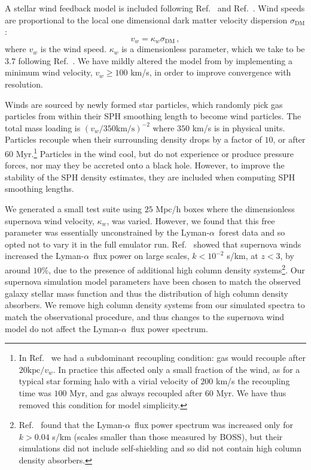 \documentclass[a4paper,11pt]{article}
\newcommand{\Lya}{Lyman-$\alpha$}
\begin{document}
A stellar wind feedback model is included following Ref.~\citep{Okamoto:2010} and Ref.~\cite{Bird:2022}. Wind speeds are proportional to the local one dimensional dark matter velocity dispersion $\sigma_\mathrm{DM}$:
\begin{equation}
v_w = \kappa_w \sigma_\mathrm{DM} \,,
\end{equation}
where $v_w$ is the wind speed. $\kappa_w$ is a dimensionless parameter, which we take to be $3.7$ following Ref.~\cite{Vogelsberger:2013}. We have mildly altered the model from \cite{Bird:2022} by implementing a minimum wind velocity, $v_w \geq 100$ km/s, in order to improve convergence with resolution.

Winds are sourced by newly formed star particles, which randomly pick gas particles from within their SPH smoothing length to become wind particles. The total mass loading is $(v_w/ 350 \mathrm{km/s})^{-2}$ where $350$ km/s is in physical units. Particles recouple when their surrounding density drops by a factor of $10$, or after $60$ Myr.\footnote{In Ref.~\cite{Bird:2022} we had a subdominant recoupling condition: gas would recouple after $20 \mathrm{kpc} / v_w$. In practice this affected only a small fraction of the wind, as for a typical star forming halo with a virial velocity of $200$ km/s the recoupling time was $100$ Myr, and gas always recoupled after $60$ Myr. We have thus removed this condition for model simplicity.} Particles in the wind cool, but do not experience or produce pressure forces, nor may they be accreted onto a black hole. However, to improve the stability of the SPH density estimates, they are included when computing SPH smoothing lengths.

We generated a small test suite using $25$ Mpc/h boxes where the dimensionless supernova wind velocity, $\kappa_w$, was varied. However, we found that this free parameter was essentially unconstrained by the \Lya~forest data and so opted not to vary it in the full emulator run. Ref.~\cite{Bolton:2017} showed that supernova winds increased the \Lya~flux power on large scales, $k < 10^{-2}$ s/km, at $z < 3$, by around $10\%$, due to the presence of additional high column density systems\footnote{Ref.~\cite{Viel:2013} found that the \Lya~flux power spectrum was increased only for $ k > 0.04$ s/km (scales smaller than those measured by BOSS), but their simulations did not include self-shielding and so did not contain high column density absorbers.}. Our supernova simulation model parameters have been chosen to match the observed galaxy stellar mass function and thus the distribution of high column density absorbers. We remove high column density systems from our simulated spectra to match the observational procedure, and thus changes to the supernova wind model do not affect the \Lya~flux power spectrum.
\end{document}
